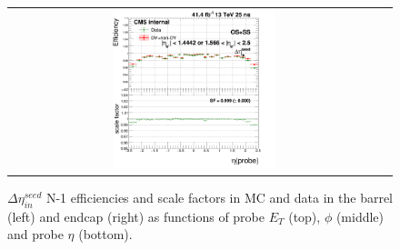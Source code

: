 \begin{figure}[bh]
\begin{center}
\begin{tabular}{cc}
      \includegraphics[width=0.45\textwidth]{figures/Zprime/2017/ScaleFactor/SameSign/N-1/g_compare_cut_eta_Barrel+Endcap_ea_ta_inc_AS_N_1_DEtaIn_PUW.png}
    \end{tabular}
    \caption{$\Delta \eta_{in}^{seed}$ N-1 efficiencies and scale factors in MC and data in the barrel (left) and endcap (right) as functions of probe $E_T$ (top), $\phi$ (middle) and probe $\eta$ (bottom).}
    \label{fig:DEtaIn_2017}
  \end{center}
\end{figure}

